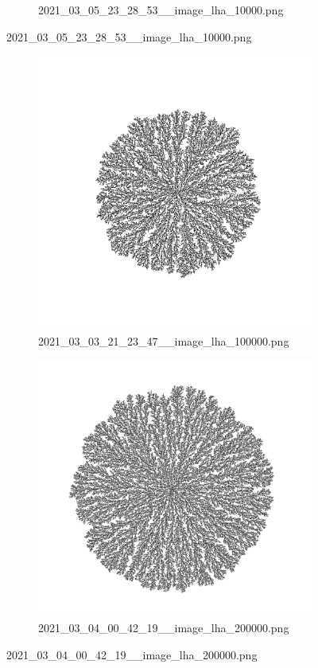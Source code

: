 \documentclass[12pt,a4paper]{scrartcl}
\newcommand{\1}{\mathbbm{1}}
\theoremstyle{definition}
\numberwithin{equation}{section}
\begin{document}
\begin{figure}[h!]
\begin{subfigure}[b]{.49\textwidth}
		\caption{2021\_03\_05\_23\_28\_53\_\_image\_lha\_10000.png}
	\end{subfigure}
\end{figure}

\begin{figure}[p]
	\centering
	\begin{subfigure}[]{0.72\textwidth}
		\includegraphics[width=1\linewidth]{images/ia/2021_03_03_21_23_47__image_lha_100000.png}
		\caption{2021\_03\_03\_21\_23\_47\_\_image\_lha\_100000.png} 
	\end{subfigure}
	\begin{subfigure}[]{0.72\textwidth}
		\includegraphics[width=1\linewidth]{images/ia/2021_03_04_00_42_19__image_lha_200000.png}
		\caption{2021\_03\_04\_00\_42\_19\_\_image\_lha\_200000.png} 
	\end{subfigure}
\end{figure}
\end{document}

